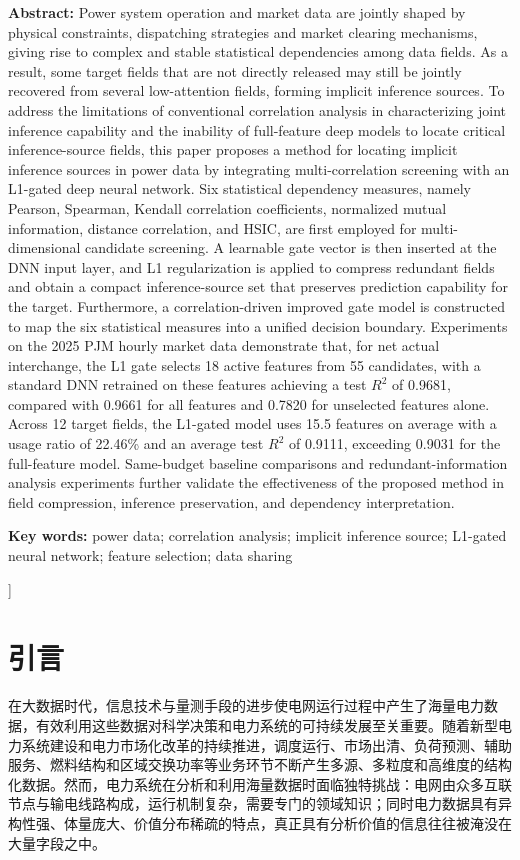 \documentclass[UTF8,zihao=5,twoside]{ctexart}
\numberwithin{equation}{section}
\newcommand{\fundcn}{基金项目：无。}
\newcommand{\funden}{Foundation item: None.}
\begin{document}
\noindent\textbf{Abstract:} Power system operation and market data are jointly shaped by physical constraints, dispatching strategies and market clearing mechanisms, giving rise to complex and stable statistical dependencies among data fields. As a result, some target fields that are not directly released may still be jointly recovered from several low-attention fields, forming implicit inference sources. To address the limitations of conventional correlation analysis in characterizing joint inference capability and the inability of full-feature deep models to locate critical inference-source fields, this paper proposes a method for locating implicit inference sources in power data by integrating multi-correlation screening with an L1-gated deep neural network. Six statistical dependency measures, namely Pearson, Spearman, Kendall correlation coefficients, normalized mutual information, distance correlation, and HSIC, are first employed for multi-dimensional candidate screening. A learnable gate vector is then inserted at the DNN input layer, and L1 regularization is applied to compress redundant fields and obtain a compact inference-source set that preserves prediction capability for the target. Furthermore, a correlation-driven improved gate model is constructed to map the six statistical measures into a unified decision boundary. Experiments on the 2025 PJM hourly market data demonstrate that, for net actual interchange, the L1 gate selects 18 active features from 55 candidates, with a standard DNN retrained on these features achieving a test $R^2$ of 0.9681, compared with 0.9661 for all features and 0.7820 for unselected features alone. Across 12 target fields, the L1-gated model uses 15.5 features on average with a usage ratio of 22.46\% and an average test $R^2$ of 0.9111, exceeding 0.9031 for the full-feature model. Same-budget baseline comparisons and redundant-information analysis experiments further validate the effectiveness of the proposed method in field compression, inference preservation, and dependency interpretation.\par
\noindent\textbf{Key words:} power data; correlation analysis; implicit inference source; L1-gated neural network; feature selection; data sharing\par\vspace{0.8em}

\noindent{\small\fundcn\\\funden}
\vspace{0.8em}
]

\section{引言}
在大数据时代，信息技术与量测手段的进步使电网运行过程中产生了海量电力数据，有效利用这些数据对科学决策和电力系统的可持续发展至关重要\cite{ref-liu-cps}。随着新型电力系统建设和电力市场化改革的持续推进，调度运行、市场出清、负荷预测、辅助服务、燃料结构和区域交换功率等业务环节不断产生多源、多粒度和高维度的结构化数据\cite{ref-ma-pjm,ref-fan-pjm}。然而，电力系统在分析和利用海量数据时面临独特挑战：电网由众多互联节点与输电线路构成，运行机制复杂，需要专门的领域知识；同时电力数据具有异构性强、体量庞大、价值分布稀疏的特点，真正具有分析价值的信息往往被淹没在大量字段之中\cite{ref-xing-micdnn}。
\end{document}
